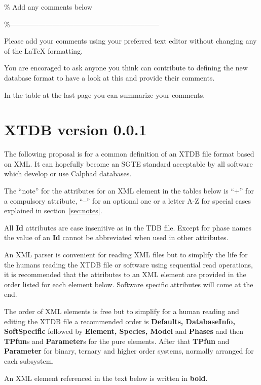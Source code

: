 \documentclass{article}
\begin{document}
\% Add any comments below

\%---------------------------------------------------------------

Please add your comments using your preferred text editor without
changing any of the LaTeX formatting.

You are encoraged to ask anyone you think can contribute to defining
the new database format to have a look at this and provide their
comments.

In the table at the last page you can summarize your comments.


\newpage

\section{XTDB version 0.0.1}

The following proposal is for a common definition of an XTDB file
format based on XML.  It can hopefully become an SGTE standard
acceptable by all software which develop or use Calphad databases.

The ``note'' for the attributes for an XML element in the tables below
is ``+'' for a compulsory attribute, ``--'' for an optional one or a
letter A-Z for special cases explained in section~\ref{sec:notes}.

All {\bf Id} attributes are case insenitive as in the TDB file.
Except for phase names the value of an {\bf Id} cannot be abbreviated
when used in other attributes.

An XML parser is convenient for reading XML files but to simplify the
life for the humans reading the XTDB file or software using sequential
read operations, it is recommended that the attributes to an XML
element are provided in the order listed for each element below.
Software specific attributes will come at the end.

The order of XML elements is free but to simplify for a human reading
and editing the XTDB file a recommended order is {\bf Defaults,
  DatabaseInfo, SoftSpecific} followed by {\bf Element, Species,
  Model} and {\bf Phases} and then {\bf TPfun}s and {\bf Parameter}s
for the pure elements.  After that {\bf TPfun} and {\bf Parameter} for
binary, ternary and higher order systems, normally arranged for each
subsystem.

An XML element referenced in the text below is written in {\bf bold}.
\end{document}
